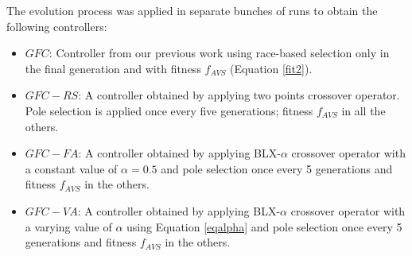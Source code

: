 \documentclass[conference]{IEEEtran}
\begin{document}
The evolution process was applied in separate bunches of runs to obtain the following controllers:
\begin{itemize}
	\item $GFC$: Controller  from our previous work \cite{salem_cig2018} 
using race-based selection only in the final generation and with fitness  $f_{AVS}$ (Equation \ref{fit2}).
	\item $GFC-RS$: A controller obtained by applying two points
          crossover operator. Pole selection is applied once every five
          generations; fitness $f_{AVS}$ in all the others. 
	\item $GFC-FA$: A controller obtained by applying BLX-$\alpha$
          crossover operator with a constant value of $\alpha=0.5$ and
          pole selection once every 5 generations and fitness
          $f_{AVS}$ in the others. 
	\item $GFC-VA$: A controller obtained by applying BLX-$\alpha$
          crossover operator with a varying value of $\alpha$ using
          Equation \ref{eqalpha} and pole selection once every 5
          generations and fitness $f_{AVS}$ in the others. 
\end{itemize}
\end{document}
